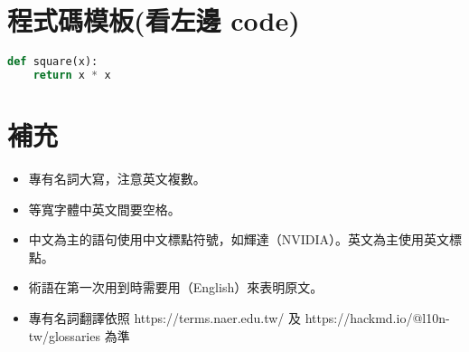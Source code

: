 \section*{程式碼模板(看左邊 code)}
\begin{lstlisting}[language=Python, caption={範例程式碼：Python 計算平方值}, label={lst:example}]
def square(x):
    return x * x
\end{lstlisting}

\section*{補充}
\begin{itemize}
    \item 專有名詞大寫，注意英文複數。
    \item 等寬字體中英文間要空格。
    \item 中文為主的語句使用中文標點符號，如輝達（NVIDIA）。英文為主使用英文標點。
    \item 術語在第一次用到時需要用（English）來表明原文。
    \item 專有名詞翻譯依照 https://terms.naer.edu.tw/ 及 https://hackmd.io/@l10n-tw/glossaries 為準
\end{itemize}
